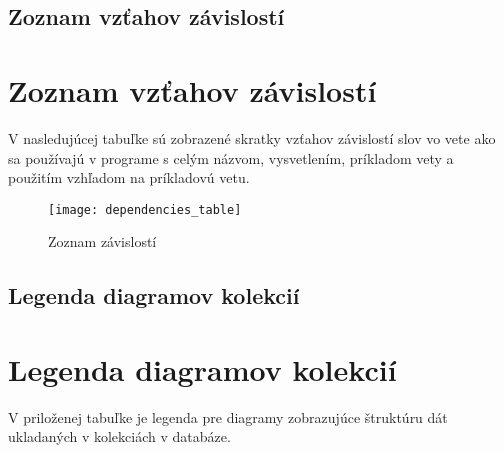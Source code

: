 
\newpage
{}
{
	\section{Zoznam vzťahov závislostí}
}
{
	\chapter{Zoznam vzťahov závislostí}
}
V nasledujúcej tabuľke sú zobrazené skratky vzťahov závislostí slov vo vete ako sa používajú v programe s celým názvom, vysvetlením, príkladom vety a použitím vzhľadom na príkladovú vetu.

\begin{figure}[H]
	\begin{center}\texttt{[image: dependencies\_table]}\end{center}
	\caption[Zoznam závislotí]{Zoznam závislostí}\label{fig:dependencies_table}
\end{figure}

\newpage
{}
{
	\section{Legenda diagramov kolekcií}
}
{
	\chapter{Legenda diagramov kolekcií}
}
V priloženej tabuľke je legenda pre diagramy zobrazujúce štruktúru dát ukladaných v kolekciách v databáze.

